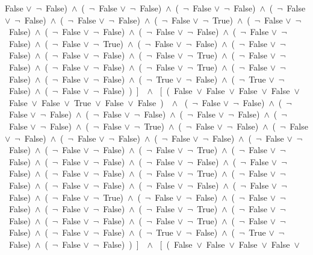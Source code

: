 ﻿\documentclass[a4paper,10pt]{article}
\begin{document}
False $\vee$\  $\neg$\ False)\ $\wedge$\ (\  $\neg$\ False $\vee$\  $\neg$\ False)\ $\wedge$\ (\  $\neg$\ False $\vee$\  $\neg$\ False)\ $\wedge$\ (\  $\neg$\ False $\vee$\  $\neg$\ False)\ $\wedge$\ (\  $\neg$\ False $\vee$\  $\neg$\ False)\ $\wedge$\ (\  $\neg$\ False $\vee$\  $\neg$\ True)\ $\wedge$\ (\  $\neg$\ False $\vee$\  $\neg$\ False)\ $\wedge$\ (\  $\neg$\ False $\vee$\  $\neg$\ False)\ $\wedge$\ (\  $\neg$\ False $\vee$\  $\neg$\ False)\ $\wedge$\ (\  $\neg$\ False $\vee$\  $\neg$\ False)\ $\wedge$\ (\  $\neg$\ False $\vee$\  $\neg$\ True)\ $\wedge$\ (\  $\neg$\ False $\vee$\  $\neg$\ False)\ $\wedge$\ (\  $\neg$\ False $\vee$\  $\neg$\ False)\ $\wedge$\ (\  $\neg$\ False $\vee$\  $\neg$\ False)\ $\wedge$\ (\  $\neg$\ False $\vee$\  $\neg$\ True)\ $\wedge$\ (\  $\neg$\ False $\vee$\  $\neg$\ False)\ $\wedge$\ (\  $\neg$\ False $\vee$\  $\neg$\ False)\ $\wedge$\ (\  $\neg$\ False $\vee$\  $\neg$\ True)\ $\wedge$\ (\  $\neg$\ False $\vee$\  $\neg$\ False)\ $\wedge$\ (\  $\neg$\ False $\vee$\  $\neg$\ False)\ $\wedge$\ (\  $\neg$\ True $\vee$\  $\neg$\ False)\ $\wedge$\ (\  $\neg$\ True $\vee$\  $\neg$\ False)\ $\wedge$\ (\  $\neg$\ False $\vee$\  $\neg$\ False)\ )\ ]\ \ $\wedge$ \ [\ (\ False\ $\vee$\ False\ $\vee$\ False\ $\vee$\ False\ $\vee$\ False\ $\vee$\ False\ $\vee$\ True\ $\vee$\ False\ $\vee$\ False\ )\ \ $\wedge$ \ (\  $\neg$\ False $\vee$\  $\neg$\ False)\ $\wedge$\ (\  $\neg$\ False $\vee$\  $\neg$\ False)\ $\wedge$\ (\  $\neg$\ False $\vee$\  $\neg$\ False)\ $\wedge$\ (\  $\neg$\ False $\vee$\  $\neg$\ False)\ $\wedge$\ (\  $\neg$\ False $\vee$\  $\neg$\ False)\ $\wedge$\ (\  $\neg$\ False $\vee$\  $\neg$\ True)\ $\wedge$\ (\  $\neg$\ False $\vee$\  $\neg$\ False)\ $\wedge$\ (\  $\neg$\ False $\vee$\  $\neg$\ False)\ $\wedge$\ (\  $\neg$\ False $\vee$\  $\neg$\ False)\ $\wedge$\ (\  $\neg$\ False $\vee$\  $\neg$\ False)\ $\wedge$\ (\  $\neg$\ False $\vee$\  $\neg$\ False)\ $\wedge$\ (\  $\neg$\ False $\vee$\  $\neg$\ False)\ $\wedge$\ (\  $\neg$\ False $\vee$\  $\neg$\ True)\ $\wedge$\ (\  $\neg$\ False $\vee$\  $\neg$\ False)\ $\wedge$\ (\  $\neg$\ False $\vee$\  $\neg$\ False)\ $\wedge$\ (\  $\neg$\ False $\vee$\  $\neg$\ False)\ $\wedge$\ (\  $\neg$\ False $\vee$\  $\neg$\ False)\ $\wedge$\ (\  $\neg$\ False $\vee$\  $\neg$\ False)\ $\wedge$\ (\  $\neg$\ False $\vee$\  $\neg$\ True)\ $\wedge$\ (\  $\neg$\ False $\vee$\  $\neg$\ False)\ $\wedge$\ (\  $\neg$\ False $\vee$\  $\neg$\ False)\ $\wedge$\ (\  $\neg$\ False $\vee$\  $\neg$\ False)\ $\wedge$\ (\  $\neg$\ False $\vee$\  $\neg$\ False)\ $\wedge$\ (\  $\neg$\ False $\vee$\  $\neg$\ True)\ $\wedge$\ (\  $\neg$\ False $\vee$\  $\neg$\ False)\ $\wedge$\ (\  $\neg$\ False $\vee$\  $\neg$\ False)\ $\wedge$\ (\  $\neg$\ False $\vee$\  $\neg$\ False)\ $\wedge$\ (\  $\neg$\ False $\vee$\  $\neg$\ True)\ $\wedge$\ (\  $\neg$\ False $\vee$\  $\neg$\ False)\ $\wedge$\ (\  $\neg$\ False $\vee$\  $\neg$\ False)\ $\wedge$\ (\  $\neg$\ False $\vee$\  $\neg$\ True)\ $\wedge$\ (\  $\neg$\ False $\vee$\  $\neg$\ False)\ $\wedge$\ (\  $\neg$\ False $\vee$\  $\neg$\ False)\ $\wedge$\ (\  $\neg$\ True $\vee$\  $\neg$\ False)\ $\wedge$\ (\  $\neg$\ True $\vee$\  $\neg$\ False)\ $\wedge$\ (\  $\neg$\ False $\vee$\  $\neg$\ False)\ )\ ]\ \ $\wedge$ \ [\ (\ False\ $\vee$\ False\ $\vee$\ False\ $\vee$\ False\ $\vee$\ 
\end{document}
